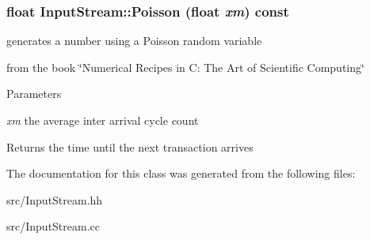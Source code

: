 \subsubsection[{Poisson}]{\setlength{\rightskip}{0pt plus 5cm}float InputStream::Poisson (float {\em xm}) const}\label{class_d_r_a_msim_i_i_1_1_input_stream_add6af3d1e6c21f1a5d847d55f4a7e82a}


generates a number using a Poisson random variable 

from the book \char`\"{}Numerical Recipes in C: The Art of Scientific Computing\char`\"{} 
\begin{DoxyParams}{Parameters}
\item[{\em xm}]the average inter arrival cycle count \end{DoxyParams}
\begin{DoxyReturn}{Returns}
the time until the next transaction arrives 
\end{DoxyReturn}


The documentation for this class was generated from the following files:\begin{DoxyCompactItemize}
\item 
src/InputStream.hh\item 
src/InputStream.cc\end{DoxyCompactItemize}
